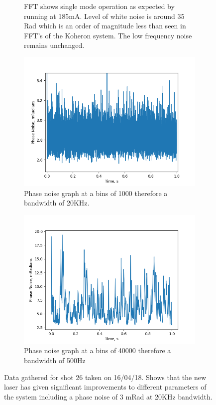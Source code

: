 \documentclass[12pt,a4paper,oneside]{report}
\begin{document}
\begin{figure}[H]
\begin{subfigure}{.5\textwidth}
    \caption{FFT shows single mode operation as expected by running at 185mA. Level of white noise is around 35 Rad which is an order of magnitude less than seen in FFT's of the Koheron system. The low frequency noise remains unchanged.}
  \end{subfigure}
  \begin{subfigure}{.5\textwidth}
    \centering\captionsetup{width=.9\linewidth}
    \includegraphics[width=\textwidth,angle=0]{DImages/Phase_Noise_for_Scene_shot_26_with_bandwidth___1000_Date_20180416-1.png}
    \caption{Phase noise graph at a bins of 1000 therefore a bandwidth of 20KHz.}
  \end{subfigure}
  \begin{subfigure}{.5\textwidth}
    \centering\captionsetup{width=.9\linewidth}
    \includegraphics[width=\textwidth, angle=0]{DImages/Phase_Noise_for_Scene_shot_26_with_bandwidth___40000_Date_20180416.png}
    \caption{Phase noise graph at a bins of 40000 therefore a bandwidth of 500Hz}
  \end{subfigure}
\caption{Data gathered for shot 26 taken on 16/04/18. Shows that the new laser has given significant improvements to different parameters of the system including a phase noise of 3 mRad at 20KHz bandwidth.}
\label{fig:4-shot-26-20180416}
\end{figure}
\end{document}
